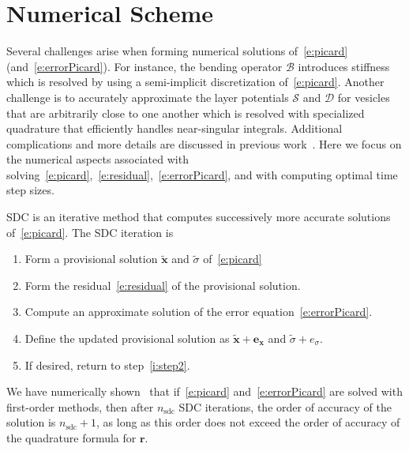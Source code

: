 \documentclass[3p,times,procedia]{elsarticle}
\newcommand{\rr}{{\mathbf{r}}}
\newcommand{\xx}{{\mathbf{x}}}
\newcommand{\exx}{\mathbf{e}_{\xx}}
\newcommand{\esigma}{e_{\sigma}}
\newcommand{\tsigma}{{\tilde{\sigma}}}
\newcommand{\txx}{{\tilde{\xx}}}
\newcommand{\BB}{{\mathcal{B}}}
\newcommand{\DD}{{\mathcal{D}}}
\renewcommand{\SS}{{\mathcal{S}}}
\newcommand{\sdc}{{\mathrm{sdc}}}
\begin{document}
\section{Numerical Scheme}
\label{s:NumericalScheme}
Several challenges arise when forming numerical solutions
of~\eqref{e:picard} (and~\eqref{e:errorPicard}).  For instance, the
bending operator $\BB$ introduces stiffness which is resolved by using a
semi-implicit discretization of~\eqref{e:picard}.  Another challenge is
to accurately approximate the layer potentials $\SS$ and $\DD$ for
vesicles that are arbitrarily close to one another which is resolved
with specialized quadrature that efficiently handles near-singular
integrals.  Additional complications and more details are discussed in
previous work~\cite{vee:gue:zor:bir2009,qua:bir2014b}.  Here we focus on
the numerical aspects associated with
solving~\eqref{e:picard},~\eqref{e:residual},~\eqref{e:errorPicard}, and
with computing optimal time step sizes.

SDC is an iterative method that computes successively more accurate
solutions of~\eqref{e:picard}.  The SDC iteration is
\begin{enumerate}
  \item Form a provisional solution $\txx$ and $\tsigma$
  of~\eqref{e:picard}
  \item Form the residual~\eqref{e:residual} of the provisional
  solution.
  \label{i:step2}
  \item Compute an approximate solution of the error
  equation~\eqref{e:errorPicard}.
  \item Define the updated provisional solution as $\txx + \exx$ and
  $\tsigma{} + \esigma$.
  \item If desired, return to step~\ref{i:step2}.
\end{enumerate}
We have numerically shown~\cite{qua:bir2014c} that if~\eqref{e:picard}
and~\eqref{e:errorPicard} are solved with first-order methods, then
after $n_{\sdc}$ SDC iterations, the order of accuracy of the solution
is $n_{\sdc} + 1$, as long as this order does not exceed the order of
accuracy of the quadrature formula for $\rr$.

\end{document}
